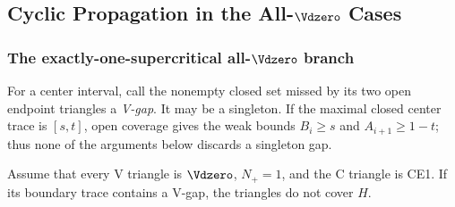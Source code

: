 \subsection{Cyclic Propagation in the All-$\Vdzero$ Cases}
\label{sec:cyclic-all-vd0}

\subsubsection{The exactly-one-supercritical all-$\Vdzero$ branch}

For a center interval, call the nonempty closed set missed by its two open
endpoint triangles a \emph{V-gap}.  It may be a singleton.  If the maximal
closed center trace is $[s,t]$, open coverage gives the weak bounds
$B_i\ge s$ and $A_{i+1}\ge1-t$; thus none of the arguments below discards a
singleton gap.

\begin{proposition}
\label{prop:ce1-one-gap}
Assume that every V triangle is $\Vdzero$, $N_+=1$, and the C triangle is
CE1.  If its boundary trace contains a V-gap, the triangles do not cover $H$.
\end{proposition}

